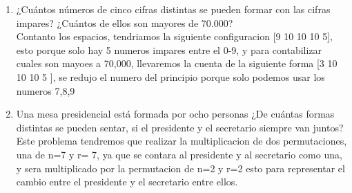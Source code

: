 \documentclass[12pt,letterpaper]{report}
\begin{document}
\begin{enumerate}
Usando permutaciones se tiene donde n=7, ya que no hay inicio ni fin en el circulo se tiene que:
\begin{align*}
    P^7_7= \frac{7!}{0!}=7!
\end{align*}
\item ¿Cuántos números de cinco cifras distintas se pueden formar con las cifras impares? ¿Cuántos de ellos son mayores de 70.000?\\
Contanto los espacios, tendriamos la siguiente configuracion [9 10 10 10 5], esto porque solo hay 5 numeros impares entre el 0-9, y para contabilizar cuales son mayoes a 70,000, llevaremos la cuenta de la siguiente forma [3 10 10 10 5 ], se redujo el numero del principio porque solo podemos usar los numeros 7,8,9
\item Una mesa presidencial está formada por ocho personas ¿De cuántas formas distintas se pueden sentar, si el presidente y el secretario siempre van juntos?\\
Este problema tendremos que realizar la multiplicacion de dos permutaciones, una de n=7 y r= 7, ya que se contara al presidente y al secretario como una, y sera multiplicado por la permutacion de n=2 y r=2 esto para representar el cambio entre el presidente y el secretario entre ellos.
\end{enumerate}
\end{document}
